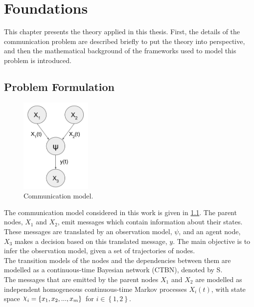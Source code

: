 \chapter{Foundations}
\label{chap:2}

This chapter presents the theory applied in this thesis. First, the details of the communication problem are described briefly to put the theory into perspective, and then the mathematical background of the frameworks used to model this problem is introduced. 

\section{Problem Formulation}
\label{sec:prob_formulation}

\begin{figure}
	\begin{center}
		\includegraphics[width=3.5cm]{figures/simple_graph}
		\caption{Communication model.}
		\label{fig:graph_model}
	\end{center}
\end{figure} 
The communication model considered in this work is given in \cref{fig:graph_model}. The parent nodes, $X_{1}$ and $ X_{2}$, emit messages which contain information about their states. These messages are translated by an observation model, $\psi$, and an agent node, $ X_{3} $ makes a decision based on this translated message, $ y $. The main objective is to infer the observation model, given a set of trajectories of nodes.\\
The transition models of the nodes and the dependencies between them are modelled as a continuous-time Bayesian network (CTBN), denoted by S. \\%
The messages that are emitted by the parent nodes $X_{1}$ and $ X_{2} $ are modelled as independent homogeneous continuous-time Markov processes $X_{i}(t)$, with state space $ \rchi_{i} = \left\lbrace x_{1}, x_{2}, ..., x_{m} \right\rbrace  $ for $ i \in \left\lbrace 1,2 \right\rbrace $.\\
